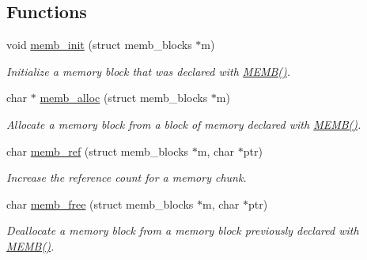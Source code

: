 \subsection*{Functions}
\begin{CompactItemize}
\item 
void \hyperlink{a00060_gd58a6c7e62ae59bf7a016ded12ca2910}{memb\_\-init} (struct memb\_\-blocks $\ast$m)
\begin{CompactList}\small\item\em Initialize a memory block that was declared with \hyperlink{a00060_g8457539d6a6eaecded820f4042b8314a}{MEMB()}. \item\end{CompactList}\item 
char $\ast$ \hyperlink{a00060_g73bf7c370e6ada339f102d4c9768e48c}{memb\_\-alloc} (struct memb\_\-blocks $\ast$m)
\begin{CompactList}\small\item\em Allocate a memory block from a block of memory declared with \hyperlink{a00060_g8457539d6a6eaecded820f4042b8314a}{MEMB()}. \item\end{CompactList}\item 
char \hyperlink{a00060_ga02c1627ee9488468c8cdef7fed74d91}{memb\_\-ref} (struct memb\_\-blocks $\ast$m, char $\ast$ptr)
\begin{CompactList}\small\item\em Increase the reference count for a memory chunk. \item\end{CompactList}\item 
char \hyperlink{a00060_g7174da2ea729ba661256d123f08ed272}{memb\_\-free} (struct memb\_\-blocks $\ast$m, char $\ast$ptr)
\begin{CompactList}\small\item\em Deallocate a memory block from a memory block previously declared with \hyperlink{a00060_g8457539d6a6eaecded820f4042b8314a}{MEMB()}. \item\end{CompactList}\end{CompactItemize}
